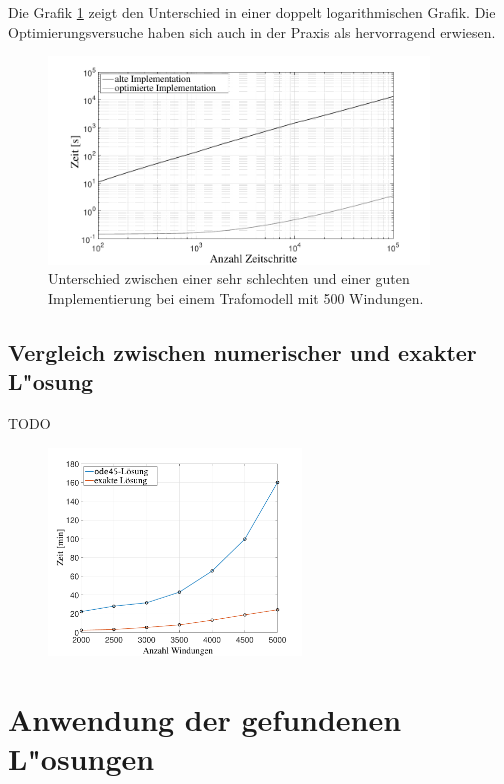 \begin{refsection}
Die Grafik \ref{trafo:Optimierung} zeigt den Unterschied in einer doppelt logarithmischen Grafik. Die Optimierungsversuche haben sich auch in der Praxis als hervorragend erwiesen.

\begin{figure}
	\centering
	\includegraphics[width=0.9\textwidth]{./trafo/images/differenceOptimization.pdf}
	\caption{Unterschied zwischen einer sehr schlechten und einer guten Implementierung bei einem Trafomodell mit 500 Windungen.}
	\label{trafo:Optimierung}
\end{figure}

\subsection{Vergleich zwischen numerischer und exakter L"osung}
\color{red}TODO\color{black}

	\begin{figure}
		\centering
		\includegraphics[width=0.6\textwidth]{./Trafo/images/ode45vsExact.pdf}
	\end{figure}

\section{Anwendung der gefundenen L"osungen}


\end{refsection}
